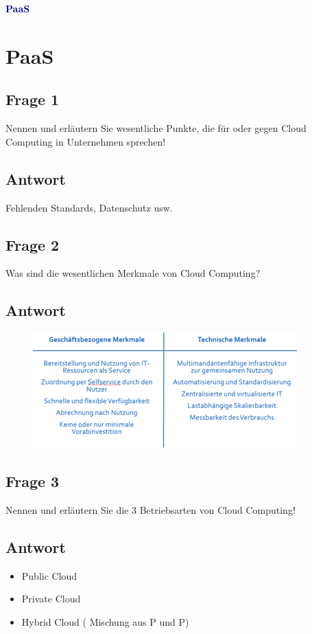 \textbf{\textcolor{darkblue}{ PaaS}}~

\section*{PaaS}
\subsection*{Frage 1}
Nennen und erläutern Sie wesentliche Punkte, die für oder gegen Cloud Computing in Unternehmen sprechen!
\subsection*{Antwort}
Fehlenden Standards, Datenschutz usw.
\subsection*{Frage 2}
Was sind die wesentlichen Merkmale von Cloud Computing?
\subsection*{Antwort}
\begin{figure}
	\centering
	\includegraphics[width=0.7\linewidth]{screenshot003}
	\caption{}
	\label{fig:screenshot003}
\end{figure}

\subsection*{Frage 3}
Nennen und erläutern Sie die 3 Betriebsarten von Cloud Computing!
\subsection*{Antwort}
\begin{itemize}
	\item Public Cloud
	\item Private Cloud
	\item Hybrid Cloud ( Mischung aus P und P)
\end{itemize}
